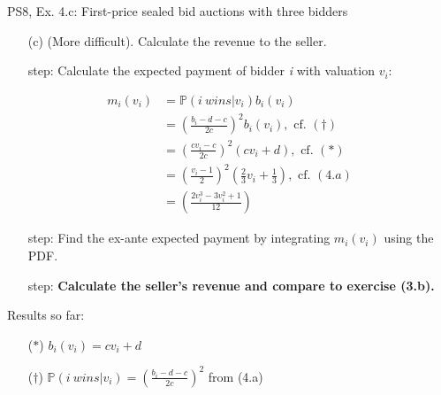\begin{frame}{PS8, Ex. 4.c: First-price sealed bid auctions with three bidders}
    \begin{itemize}
      \item[(c)] (More difficult). Calculate the revenue to the seller.
    \end{itemize}
    \vspace{-8pt}
    \begin{multicols}{2}
      \begin{itemize}
        \item[\nth{1} step:] Calculate the expected payment of bidder \textit{i} with valuation $v_i$:
      \end{itemize}
      \vspace{-10pt}
      \begin{align*}
        m_i(v_i)&=\mathbb{P}(i\ wins|v_i)b_i(v_i)\\
                &=\left(\frac{b_i-d-c}{2c}\right)^2b_i(v_i),\text{ cf. }(\dagger)\\
                &=\left(\frac{cv_i-c}{2c}\right)^2(cv_i+d),\text{ cf. }(*)\\
                &=\left(\frac{v_i-1}{2}\right)^2\left(\frac{2}{3}v_i+\frac{1}{3}\right),\text{ cf. }(4.a)\\
                &=\left(\frac{2v_i^3-3v_i^2+1}{12}\right)
      \end{align*}
      \vspace{-10pt}
      \begin{itemize}
        \item[\nth{2} step:] Find the ex-ante expected payment by integrating $m_i(v_i)$ using the PDF.
      \end{itemize}
      \vspace{-4pt}
      \vspace{-4pt}
      \begin{itemize}
        \item[\nth{3} step:] \textbf{Calculate the seller's revenue and compare to exercise (3.b).}
      \end{itemize}
      \vfill\null\columnbreak
      Results so far:
      \vspace{-6pt}
      \begin{itemize}
        \item[($*$)] $b_i(v_i) = cv_i+d$
        \item[($\dagger$)] $\mathbb{P}(i\ wins|v_i)=\left(\frac{b_i-d-c}{2c}\right)^2$ from (4.a)

\end{itemize}
\end{multicols}
\end{frame}
